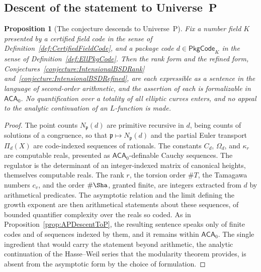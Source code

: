 \documentclass[10pt, reqno]{amsart}
\theoremstyle{plain}
\newtheorem{proposition}[theorem]{Proposition}
\theoremstyle{definition}
\theoremstyle{plain}
\begin{document}
\subsection{Descent of the statement to Universe~P}\label{subsec:BSDDescent}

\begin{proposition}[The conjecture descends to Universe~P]\label{prop:BSDDescentToP}
Fix a number field $K$ presented by a certified field code in the sense of Definition~\ref{def:CertifiedFieldCode}, and a package code $d \in \mathsf{PkgCode}_K$ in the sense of Definition~\ref{def:EllPkgCode}. Then the rank form and the refined form, Conjectures~\ref{conjecture:IntensionalBSDRank} and~\ref{conjecture:IntensionalBSDRefined}, are each expressible as a sentence in the language of second-order arithmetic, and the assertion of each is formalizable in $\mathsf{ACA}_0$. No quantification over a totality of all elliptic curves enters, and no appeal to the analytic continuation of an $L$-function is made.
\end{proposition}

\begin{proof}
The point counts $N_{\mathfrak{p}}(d)$ are primitive recursive in $d$, being counts of solutions of a congruence, so that $\mathfrak{p} \mapsto N_{\mathfrak{p}}(d)$ and the partial Euler transport $\Pi_d(X)$ are code-indexed sequences of rationals. The constants $C_d$, $\Omega_d$, and $\kappa_r$ are computable reals, presented as $\mathsf{ACA}_0$-definable Cauchy sequences. The regulator is the determinant of an integer-indexed matrix of canonical heights, themselves computable reals. The rank $r$, the torsion order $\# T$, the Tamagawa numbers $c_v$, and the order $\# \Sha$, granted finite, are integers extracted from $d$ by arithmetical predicates. The asymptotic relation and the limit defining the growth exponent are then arithmetical statements about these sequences, of bounded quantifier complexity over the reals so coded. As in Proposition~\ref{prop:APDescentToP}, the resulting sentence speaks only of finite codes and of sequences indexed by them, and it remains within $\mathsf{ACA}_0$. The single ingredient that would carry the statement beyond arithmetic, the analytic continuation of the Hasse--Weil series that the modularity theorem provides, is absent from the asymptotic form by the choice of formulation.
\end{proof}
\end{document}
